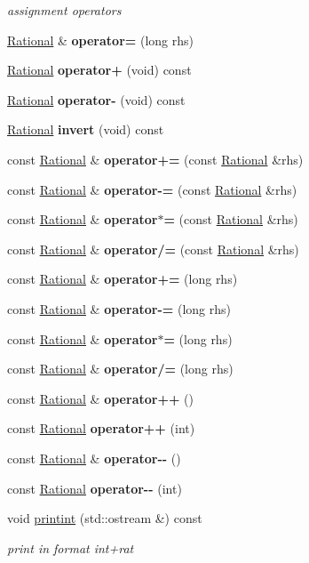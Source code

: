 \begin{DoxyCompactItemize}
\begin{DoxyCompactList}\small\item\em assignment operators \end{DoxyCompactList}\item 
\mbox{\hyperlink{classRational}{Rational}} \& {\bfseries operator=} (long rhs)
\item 
\mbox{\label{classRational_a25ae5a95c48b8108c3c1337cec68b425}} 
\mbox{\hyperlink{classRational}{Rational}} {\bfseries operator+} (void) const
\item 
\mbox{\label{classRational_a86b979ead01c9c4af10808259f86750d}} 
\mbox{\hyperlink{classRational}{Rational}} {\bfseries operator-\/} (void) const
\item 
\mbox{\label{classRational_ab2bd5760859089e81eb3d6ed98341432}} 
\mbox{\hyperlink{classRational}{Rational}} {\bfseries invert} (void) const
\item 
const \mbox{\hyperlink{classRational}{Rational}} \& {\bfseries operator+=} (const \mbox{\hyperlink{classRational}{Rational}} \&rhs)
\item 
const \mbox{\hyperlink{classRational}{Rational}} \& {\bfseries operator-\/=} (const \mbox{\hyperlink{classRational}{Rational}} \&rhs)
\item 
const \mbox{\hyperlink{classRational}{Rational}} \& {\bfseries operator$\ast$=} (const \mbox{\hyperlink{classRational}{Rational}} \&rhs)
\item 
const \mbox{\hyperlink{classRational}{Rational}} \& {\bfseries operator/=} (const \mbox{\hyperlink{classRational}{Rational}} \&rhs)
\item 
const \mbox{\hyperlink{classRational}{Rational}} \& {\bfseries operator+=} (long rhs)
\item 
const \mbox{\hyperlink{classRational}{Rational}} \& {\bfseries operator-\/=} (long rhs)
\item 
const \mbox{\hyperlink{classRational}{Rational}} \& {\bfseries operator$\ast$=} (long rhs)
\item 
const \mbox{\hyperlink{classRational}{Rational}} \& {\bfseries operator/=} (long rhs)
\item 
const \mbox{\hyperlink{classRational}{Rational}} \& {\bfseries operator++} ()
\item 
const \mbox{\hyperlink{classRational}{Rational}} {\bfseries operator++} (int)
\item 
const \mbox{\hyperlink{classRational}{Rational}} \& {\bfseries operator-\/-\/} ()
\item 
const \mbox{\hyperlink{classRational}{Rational}} {\bfseries operator-\/-\/} (int)
\item 
void \mbox{\hyperlink{group__general_ga11edcb2aed3334c33c9e962be2bda2fe}{printint}} (std\+::ostream \&) const
\begin{DoxyCompactList}\small\item\em print in format int+rat \end{DoxyCompactList}\end{DoxyCompactItemize}


